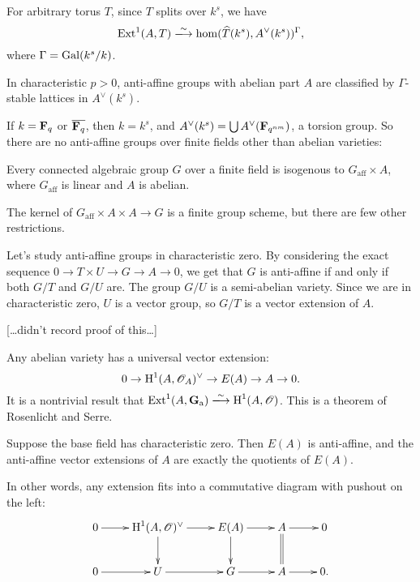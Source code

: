 For arbitrary torus $T$, since $T$ splits over $k^s$, we have 
\[
  \extensions^1(A,T) \isomorphism \hom(\widehat T(k^s),A^\vee(k^s))^\Gamma ,
\]
where $\Gamma=\operatorname{Gal}(k^s/k)$. 

\begin{coro}
In characteristic $p>0$, anti-affine groups with abelian part $A$ are 
classified by $\Gamma$-stable lattices in $A^\vee(k^s)$. 
\end{coro}

If $k=\mathbf{F}_q$ or $\overline{\mathbf{F}_q}$, then $k=k^s$, and 
$A^\vee(k^s)=\bigcup A^\vee(\mathbf{F}_{q^{n m}})$, a torsion group. So there are 
no anti-affine groups over finite fields other than abelian varieties: 

\begin{coro}[Arima '61]
Every connected algebraic group $G$ over a finite field is isogenous to 
$G_\mathrm{aff}\times A$, where $G_\mathrm{aff}$ is linear and $A$ is abelian. 
\end{coro}

The kernel of $G_\mathrm{aff}\times A \times A\to G$ is a finite group scheme, 
but there are few other restrictions. 





Let's study anti-affine groups in characteristic zero. 
By considering the exact sequence $0 \to T\times U \to G\to A \to 0$, we get 
that $G$ is anti-affine if and only if both $G/T$ and $G/U$ are. The group 
$G/U$ is a semi-abelian variety. Since we are in characteristic zero, $U$ is a 
vector group, so $G/T$ is a vector extension of $A$. 

[\ldots didn't record proof of this\ldots]

Any abelian variety has a universal vector extension:
\[
  0 \to \operatorname{H}^1(A,\mathscr{O}_A)^\vee \to E(A) \to A \to 0 .
\]
It is a nontrivial result that 
$\extensions^1(A,\dG_\additive) \isomorphism \h^1(A,\sO)$. This is a theorem of 
Rosenlicht and Serre. 

\begin{prop}
Suppose the base field has characteristic zero. Then $E(A)$ is anti-affine, 
and the anti-affine vector extensions of $A$ are exactly the quotients of 
$E(A)$. 
\end{prop}

In other words, any extension fits into a commutative diagram with pushout on 
the left: 
\[\xymatrix{
  0 \ar[r] 
    & \h^1(A,\sO)^\vee \ar[r] \ar[d] 
    & E(A) \ar[r] \ar[d] 
    & A \ar[r] \ar@{=}[d] 
    & 0 \\
  0 \ar[r] 
    & U \ar[r] 
    & G \ar[r] 
    & A \ar[r] 
    & 0 .
}\]

